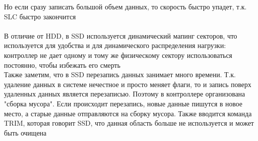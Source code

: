 \documentclass[12pt]{article}
\begin{document}
Но если сразу записать большой объем данных, то скорость быстро упадет, т.к. SLC быстро закончится\\\\
В отличие от HDD, в SSD используется динамический мапинг секторов, что используется для удобства и для динамического распределения нагрузки: контроллер не дает одному и тому же физическому сектору использоваться постоянно, чтобы избежать его смерть\\
Также заметим, что в SSD перезапись данных занимает много времени. Т.к. удаление данных в системе нечестное и просто меняет флаги, то и запись поверх удаленных данных является перезаписью. Поэтому в контроллере организована "сборка мусора". Если происходит перезапись, новые данные пишутся в новое место, а старые данные отправляются на сборку мусора. Также вводится команда TRIM, которая говорит SSD, что данная область больше не используется и может быть очищена\\
\end{document}
